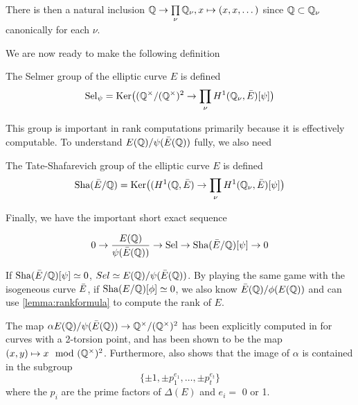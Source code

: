 \documentclass[12pt, a4paper]{amsart}
\begin{document}
There is then a natural inclusion ${\mathbb Q} \rightarrow \prod\limits_\nu {\mathbb Q}_\nu,
x \mapsto (x, x, \dots)$ since ${\mathbb Q} \subset {\mathbb Q}_{\nu}$ canonically for each $\nu$.


We are now ready to make the following definition

\begin{defn}
  The Selmer group of the elliptic curve $E$ is defined
  $$\text{\normalfont Sel}_\psi = \text{Ker}\big(({\mathbb Q}^{\times}/({\mathbb Q}^{\times})^2 \rightarrow
  \prod\limits_\nu H^1({\mathbb Q}_\nu, \bar{E})[\psi]\big)$$
\end{defn}

This group is important in rank computations primarily because it is effectively
computable. To understand $E({\mathbb Q})/\psi(\bar{E}({\mathbb Q}))$ fully, we also need

\begin{defn} \label{defn:sha}
  The Tate-Shafarevich group of the elliptic curve $E$ is defined
  $$ \text{\normalfont Sha}(\bar{E} / {\mathbb Q}) = \text{Ker} \big((H^1({\mathbb Q}, \bar{E}) \rightarrow \prod\limits_\nu H^1 ({\mathbb Q}_\nu,
  \bar{E})[\psi]\big) $$
\end{defn}

Finally, we have the important short exact sequence

\[ 0 \rightarrow \frac{E({\mathbb Q})}{\psi(\bar{E}({\mathbb Q}))} \rightarrow \text{\normalfont Sel} \rightarrow \text{\normalfont Sha}(\bar{E}/{\mathbb Q})[\psi] \rightarrow 0\]

If $\text{\normalfont Sha}(\bar{E}/{\mathbb Q})[\psi] \simeq 0$, $Sel \simeq E({\mathbb Q})/\psi(\bar{E}({\mathbb Q}))$. By playing
the same game with the isogeneous curve $\bar{E}$, if $\text{\normalfont Sha}(E/{\mathbb Q})[\phi] \simeq 0$,
we also know $\bar{E}({\mathbb Q})/\phi(E({\mathbb Q}))$ and can use \ref{lemma:rankformula} to compute
the rank of $E$. 

\begin{remark}
  The map $\alpha E({\mathbb Q}) / \psi(\bar{E}({\mathbb Q})) \rightarrow {\mathbb Q}^\times / ({\mathbb Q}^\times)^2$ has been
  explicitly computed in \cite{rational} for curves with a 2-torsion point, and
  has been shown to be the map $(x,y) \mapsto x \mod ({\mathbb Q}^\times)^2$.
  Furthermore, \cite{rational} also shows that the image of $\alpha$ is
  contained in the subgroup
  \[\{\pm 1, \pm p_1^{e_1}, \dots, \pm p_t^{e_t} \}\]
  where the $p_i$ are the prime factors of $\Delta(E)$ and $e_i =$ 0 or 1.
\end{remark}
\end{document}
